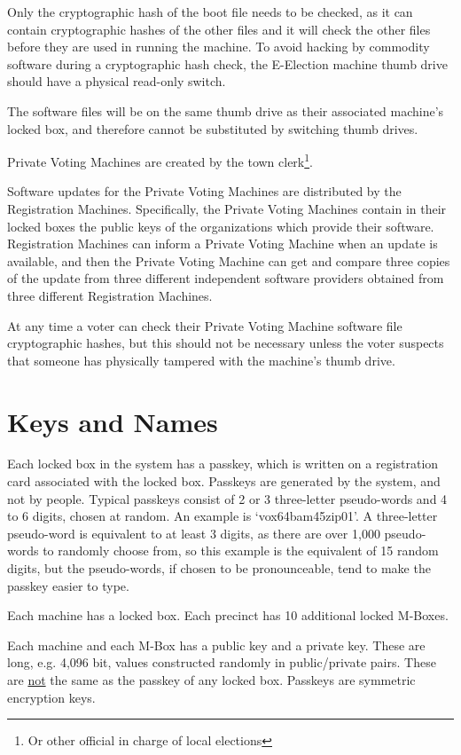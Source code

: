 \documentclass[12pt]{article}
\begin{document}
Only the cryptographic hash of the boot file needs to be checked,
as it can contain cryptographic hashes of the other files and it will check
the other files before they are used in running the machine.
To avoid hacking by commodity software during a cryptographic hash check,
the E-Election machine thumb drive should have a physical read-only
switch.

The software files will be on
the same thumb drive as their associated machine's locked box, and
therefore cannot be substituted by switching thumb drives.

Private Voting Machines are created by the town clerk\footnote{Or
other official in charge of local elections}.

Software updates for the Private Voting Machines are distributed
by the Registration Machines.  Specifically, the Private Voting
Machines contain in their locked boxes the public keys of
the organizations which provide their software.  Registration Machines
can inform a Private Voting Machine when an update is available,
and then the Private Voting Machine can get and compare three copies of the
update from three different independent
software providers obtained from three different Registration Machines.

At any time a voter can check their Private Voting Machine
software file cryptographic hashes, but this should not be
necessary unless the voter
suspects that someone has physically tampered with the machine's thumb drive.



\section{Keys and Names}

Each locked box in the system has a passkey, which is
written on a registration card associated with the locked
box.  Passkeys are generated by the system, and not by
people.  Typical passkeys consist of 2 or 3 three-letter pseudo-words
and 4 to 6 digits, chosen at random.  An example is
`vox64bam45zip01'.  A three-letter pseudo-word is equivalent to at least 3
digits, as there are over 1,000 pseudo-words to randomly choose from,
so this example is the equivalent of 15 random
digits, but the pseudo-words, if chosen to be pronounceable,
tend to make the passkey easier to type.

Each machine has a locked box.  Each precinct
has 10 additional locked M-Boxes.

Each machine and each M-Box has a public key and a private key.  These
are long, e.g. 4,096 bit, values constructed randomly
in public/private pairs.
These are \underline{not} the same as the passkey of any locked box.
Passkeys are symmetric encryption keys.
\end{document}
